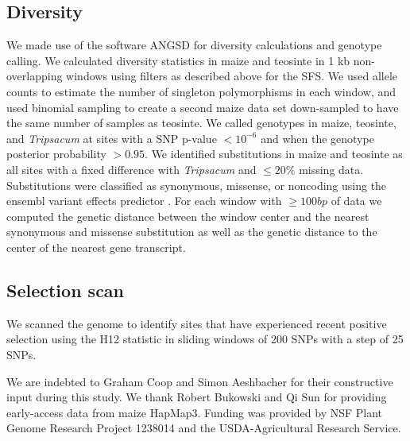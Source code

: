 \documentclass{pnastwo}
\begin{document}
\begin{article}
\begin{materials}
\subsection{Diversity}
We made use of the software ANGSD \cite{korneliussen2014} for diversity calculations and genotype calling. 
We calculated diversity statistics in maize and teosinte in 1 kb non-overlapping windows using filters as described above for the SFS. 
We used allele counts to estimate the number of singleton polymorphisms in each window, and used binomial sampling to create a second maize data set down-sampled to have the same number of samples as teosinte.
We called genotypes in maize, teosinte, and \textit{ Tripsacum} at sites with a SNP p-value $<10^{-6}$ and when the genotype posterior probability $>0.95$. 
We identified substitutions in maize and teosinte as all sites with a fixed difference with \textit{Tripsacum} and $\leq 20\%$ missing data. 
Substitutions were classified as synonymous, missense, or noncoding using the ensembl variant effects predictor \cite{mclaren2010}.
For each window with $\geq 100bp$ of data we computed the genetic distance between the window center and the nearest synonymous and missense substitution as well as the genetic distance to the center of the nearest gene transcript.  

\subsection{Selection scan}
We scanned the genome to identify sites that have experienced recent positive selection using the H12 statistic \cite{garud2015} in sliding windows of 200 SNPs with a step of 25 SNPs.

\end{materials}

\begin{acknowledgments}
We are indebted to Graham Coop and Simon Aeshbacher for their constructive input during this study. We thank Robert Bukowski and Qi Sun for providing early-access data from maize HapMap3. Funding was provided by NSF Plant Genome Research Project 1238014 and the USDA-Agricultural Research Service.
\end{acknowledgments}



\onecolumn
 


\end{article}
\end{document}
